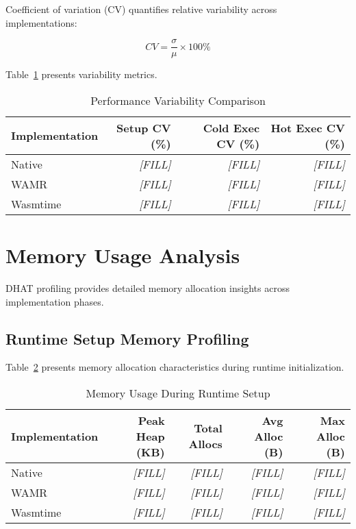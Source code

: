 Coefficient of variation (CV) quantifies relative variability across implementations:

\begin{equation}
CV = \frac{\sigma}{\mu} \times 100\%
\end{equation}

Table~\ref{tab:variability-analysis} presents variability metrics.

\begin{table}[htbp]
\centering
\caption{Performance Variability Comparison}
\label{tab:variability-analysis}
\begin{tabular}{lrrr}
\toprule
\textbf{Implementation} & \textbf{Setup CV (\%)} & \textbf{Cold Exec CV (\%)} & \textbf{Hot Exec CV (\%)} \\
\midrule
Native       & \textit{[FILL]} & \textit{[FILL]} & \textit{[FILL]} \\
WAMR         & \textit{[FILL]} & \textit{[FILL]} & \textit{[FILL]} \\
Wasmtime     & \textit{[FILL]} & \textit{[FILL]} & \textit{[FILL]} \\
\bottomrule
\end{tabular}
\end{table}

\section{Memory Usage Analysis}
\label{sec:memory-analysis}

DHAT profiling provides detailed memory allocation insights across implementation phases.

\subsection{Runtime Setup Memory Profiling}
\label{subsec:memory-setup}

Table~\ref{tab:memory-setup} presents memory allocation characteristics during runtime initialization.

\begin{table}[htbp]
\centering
\caption{Memory Usage During Runtime Setup}
\label{tab:memory-setup}
\begin{tabular}{lrrrr}
\toprule
\textbf{Implementation} & \textbf{Peak Heap (KB)} & \textbf{Total Allocs} & \textbf{Avg Alloc (B)} & \textbf{Max Alloc (B)} \\
\midrule
Native        & \textit{[FILL]} & \textit{[FILL]} & \textit{[FILL]} & \textit{[FILL]} \\
WAMR          & \textit{[FILL]} & \textit{[FILL]} & \textit{[FILL]} & \textit{[FILL]} \\
Wasmtime      & \textit{[FILL]} & \textit{[FILL]} & \textit{[FILL]} & \textit{[FILL]} \\
\bottomrule
\end{tabular}
\end{table}

